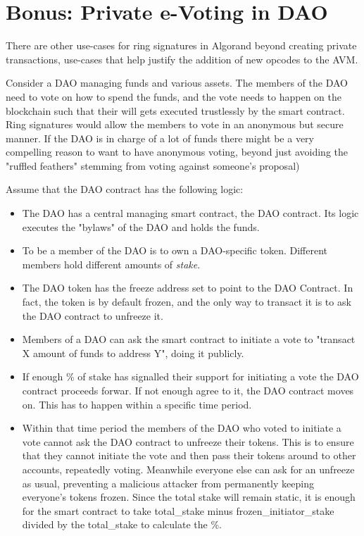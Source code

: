 \documentclass[9pt]{article}
\begin{document}
\section{Bonus: Private e-Voting in DAO}

There are other use-cases for ring signatures in Algorand beyond creating private transactions, use-cases that help justify the addition of new opcodes to the AVM.

Consider a DAO managing funds and various assets. The members of the DAO need to vote on how to spend the funds, and the vote needs to happen on the blockchain such that their will gets executed trustlessly by the smart contract. Ring signatures would allow the members to vote in an anonymous but secure manner. If the DAO is in charge of a lot of funds there might be a very compelling reason to want to have anonymous voting, beyond just avoiding the "ruffled feathers" stemming from voting against someone's proposal)

Assume that the DAO contract has the following logic:

\begin{itemize}
    \item The DAO has a central managing smart contract, the DAO contract. Its logic executes the "bylaws" of the DAO and holds the funds.
    \item To be a member of the DAO is to own a DAO-specific token. Different members hold different amounts of \textit{stake}.
    \item The DAO token has the freeze address set to point to the DAO Contract. In fact, the token is by default frozen, and the only way to transact it is to ask the DAO contract to unfreeze it.
    \item Members of a DAO can ask the smart contract to initiate a vote to "transact X amount of funds to address Y", doing it publicly. 
    \item If enough \% of stake has signalled their support for initiating a vote the DAO contract proceeds forwar. If not enough agree to it, the DAO contract moves on. This has to happen within a specific time period.
    \item Within that time period the members of the DAO who voted to initiate a vote cannot ask the DAO contract to unfreeze their tokens. This is to ensure that they cannot initiate the vote and then pass their tokens around to other accounts, repeatedly voting. Meanwhile everyone else can ask for an unfreeze as usual, preventing a malicious attacker from permanently keeping everyone's tokens frozen. Since the total stake will remain static, it is enough for the smart contract to take total\_stake minus frozen\_initiator\_stake divided by the total\_stake to calculate the \%.
\end{itemize}
\end{document}
